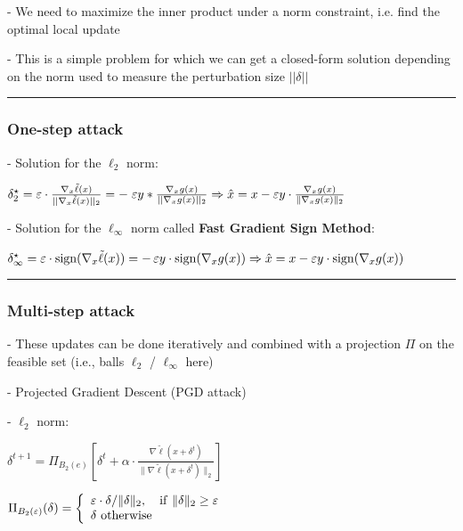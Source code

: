 - We need to maximize the inner product under a norm constraint, i.e. find the optimal local update

- This is a simple problem for which we can get a closed-form solution depending on the norm used to measure the perturbation size $||\delta||$

\vspace{4pt}
\hrule
\vspace{4pt}
\subsubsection{One-step attack}

- Solution for the $\ell_2$ norm:

$\delta_{2}^{\star}=\varepsilon\cdot\frac{\nabla_{x}\tilde{\ell}(x)}{||\nabla_{x}\tilde{\ell}(x)||_{2}}=-\;\varepsilon y*\frac{\nabla_{x}g(x)}{||\nabla_{x}g(x)||_{2}} \Rightarrow \\ \hat{x}=x-\varepsilon y\cdot\frac{\nabla_{x}g(x)}{\|\nabla_{x}g(x)\|_{2}}$

- Solution for the $\ell_{\infty}$ norm called \textbf{Fast Gradient Sign Method}:

$\delta_{\infty}^{\star}=\varepsilon\cdot\mathrm{sign}(\nabla_{x}\tilde{\ell}(x))=-\,\varepsilon y\cdot\mathrm{sign}(\nabla_{x}g(x)) \Rightarrow \\ {\hat{x}}=x-\varepsilon y\cdot\operatorname{sign}(\nabla_{x}g(x))$

\vspace{4pt}
\hrule
\vspace{4pt}
\subsubsection{Multi-step attack}


- These updates can be done iteratively and combined with a projection $\Pi$ on the feasible set (i.e., balls $\ell_2$ / $\ell_\infty$ here)

- Projected Gradient Descent (PGD attack)

- $\ell_2$ norm:

$\delta^{t+1}=\Pi_{B_{2}(e)} [\delta^{t}+\alpha\cdot\frac{\nabla\tilde{\ell}(x+\delta^{t})}{\|\nabla\tilde{\ell}(x+\delta^{t})\|_{2}}]$

$\Pi_{B_{2}(\varepsilon)}(\delta)=\left\{\begin{array}{l l}{\varepsilon\cdot\delta/\|\delta\|_{2},\quad{\mathrm{if~}}\|\delta\|_{2}\geq\varepsilon}\\ {\delta \mathrm{~otherwise}}\end{array}\right.$

